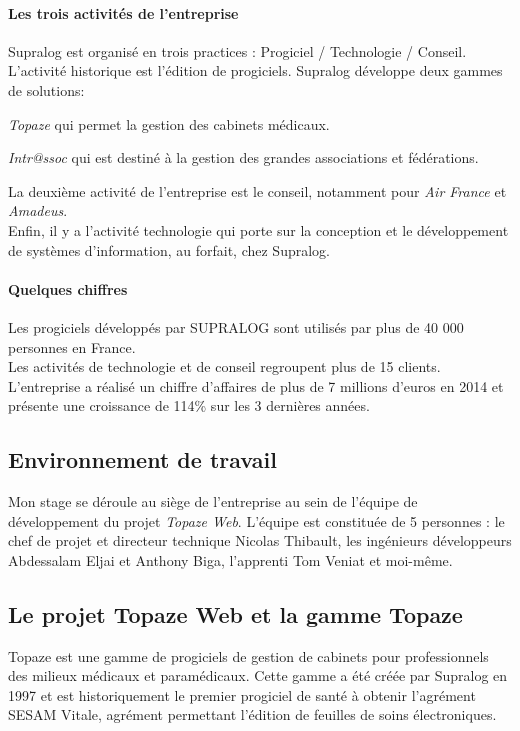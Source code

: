 \paragraph{Les trois activités de l'entreprise\\}
Supralog est organisé en trois practices : Progiciel / Technologie / Conseil.\\
L'activité historique est l'édition de progiciels. Supralog développe deux gammes de solutions:
\begin{sitemize}
\item \textit{Topaze} qui permet la gestion des cabinets médicaux.
\item \textit{Intr@ssoc} qui est destiné à la gestion des grandes associations et fédérations.
\end{sitemize}

La deuxième activité de l'entreprise est le conseil, notamment pour \textit{Air France} et \textit{Amadeus}.\\
Enfin, il y a l'activité technologie qui porte sur la conception et le développement de systèmes d'information, au forfait, chez Supralog. 

\paragraph{Quelques chiffres\\}
Les progiciels développés par SUPRALOG sont utilisés par plus de 40 000 personnes en France.\\
Les activités de technologie et de conseil regroupent plus de 15 clients.\\
L'entreprise a réalisé un chiffre d'affaires de plus de 7 millions d'euros en 2014 et présente une croissance de 114\% sur les 3 dernières années.

\subsection{Environnement de travail}
Mon stage se déroule au siège de l'entreprise au sein de l'équipe de développement du projet \textit{Topaze Web}.
L'équipe est constituée de 5 personnes : le chef de projet et directeur technique Nicolas Thibault, les ingénieurs développeurs Abdessalam Eljai et Anthony Biga, l'apprenti Tom Veniat et moi-même.

\subsection{Le projet Topaze Web et la gamme Topaze}
Topaze est une gamme de progiciels de gestion de cabinets pour professionnels des milieux
médicaux et paramédicaux. Cette gamme a été créée par Supralog en 1997 et est historiquement le
premier progiciel de santé à obtenir l'agrément SESAM Vitale, agrément permettant l’édition de
feuilles de soins électroniques.\\


